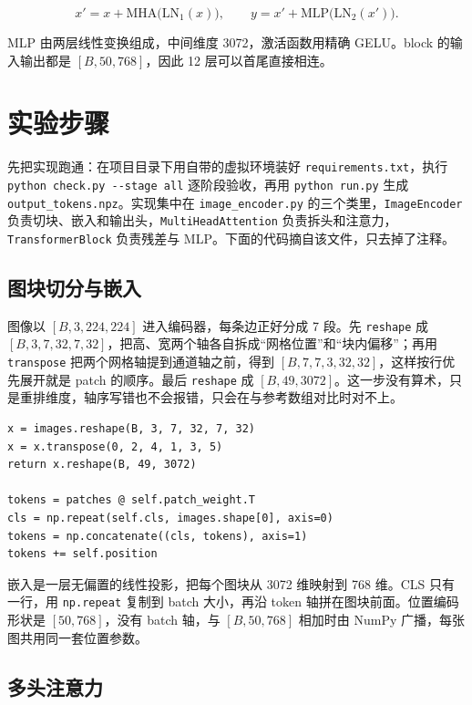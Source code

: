 \documentclass[a4paper,12pt]{article}
\begin{document}
\begin{equation}
x' = x + \mathrm{MHA}\big(\mathrm{LN}_1(x)\big),
\qquad
y = x' + \mathrm{MLP}\big(\mathrm{LN}_2(x')\big).
\label{eq:block}
\end{equation}

MLP 由两层线性变换组成，中间维度 3072，激活函数用精确 GELU。block 的输入输出都是 $[B,50,768]$，因此 12 层可以首尾直接相连。

\section{实验步骤}

先把实现跑通：在项目目录下用自带的虚拟环境装好 \texttt{requirements.txt}，执行 \texttt{python check.py -{}-stage all} 逐阶段验收，再用 \texttt{python run.py} 生成 \texttt{output\_tokens.npz}。实现集中在 \texttt{image\_encoder.py} 的三个类里，\texttt{ImageEncoder} 负责切块、嵌入和输出头，\texttt{MultiHeadAttention} 负责拆头和注意力，\texttt{TransformerBlock} 负责残差与 MLP。下面的代码摘自该文件，只去掉了注释。

\subsection{图块切分与嵌入}

图像以 $[B,3,224,224]$ 进入编码器，每条边正好分成 7 段。先 \texttt{reshape} 成 $[B,3,7,32,7,32]$，把高、宽两个轴各自拆成“网格位置”和“块内偏移”；再用 \texttt{transpose} 把两个网格轴提到通道轴之前，得到 $[B,7,7,3,32,32]$，这样按行优先展开就是 patch 的顺序。最后 \texttt{reshape} 成 $[B,49,3072]$。这一步没有算术，只是重排维度，轴序写错也不会报错，只会在与参考数组对比时对不上。

\begin{verbatim}
x = images.reshape(B, 3, 7, 32, 7, 32)
x = x.transpose(0, 2, 4, 1, 3, 5)
return x.reshape(B, 49, 3072)

tokens = patches @ self.patch_weight.T
cls = np.repeat(self.cls, images.shape[0], axis=0)
tokens = np.concatenate((cls, tokens), axis=1)
tokens += self.position
\end{verbatim}

嵌入是一层无偏置的线性投影，把每个图块从 3072 维映射到 768 维。CLS 只有一行，用 \texttt{np.repeat} 复制到 batch 大小，再沿 token 轴拼在图块前面。位置编码形状是 $[50,768]$，没有 batch 轴，与 $[B,50,768]$ 相加时由 NumPy 广播，每张图共用同一套位置参数。

\subsection{多头注意力}
\end{document}
